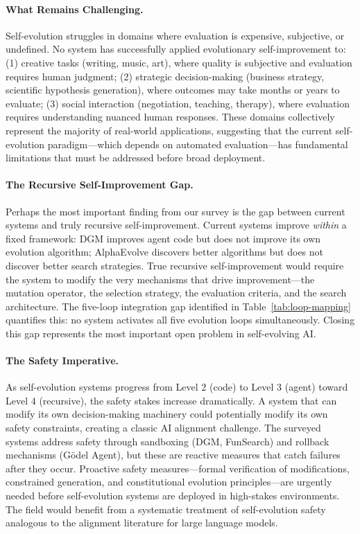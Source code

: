 \paragraph{What Remains Challenging.}
Self-evolution struggles in domains where evaluation is expensive, subjective, or undefined. No system has successfully applied evolutionary self-improvement to: (1) creative tasks (writing, music, art), where quality is subjective and evaluation requires human judgment; (2) strategic decision-making (business strategy, scientific hypothesis generation), where outcomes may take months or years to evaluate; (3) social interaction (negotiation, teaching, therapy), where evaluation requires understanding nuanced human responses. These domains collectively represent the majority of real-world applications, suggesting that the current self-evolution paradigm---which depends on automated evaluation---has fundamental limitations that must be addressed before broad deployment.

\paragraph{The Recursive Self-Improvement Gap.}
Perhaps the most important finding from our survey is the gap between current systems and truly recursive self-improvement. Current systems improve \emph{within} a fixed framework: DGM improves agent code but does not improve its own evolution algorithm; AlphaEvolve discovers better algorithms but does not discover better search strategies. True recursive self-improvement would require the system to modify the very mechanisms that drive improvement---the mutation operator, the selection strategy, the evaluation criteria, and the search architecture. The five-loop integration gap identified in Table~\ref{tab:loop-mapping} quantifies this: no system activates all five evolution loops simultaneously. Closing this gap represents the most important open problem in self-evolving AI.

\paragraph{The Safety Imperative.}
As self-evolution systems progress from Level 2 (code) to Level 3 (agent) toward Level 4 (recursive), the safety stakes increase dramatically. A system that can modify its own decision-making machinery could potentially modify its own safety constraints, creating a classic AI alignment challenge. The surveyed systems address safety through sandboxing (DGM, FunSearch) and rollback mechanisms (G\"{o}del Agent), but these are reactive measures that catch failures after they occur. Proactive safety measures---formal verification of modifications, constrained generation, and constitutional evolution principles---are urgently needed before self-evolution systems are deployed in high-stakes environments. The field would benefit from a systematic treatment of self-evolution safety analogous to the alignment literature for large language models.


